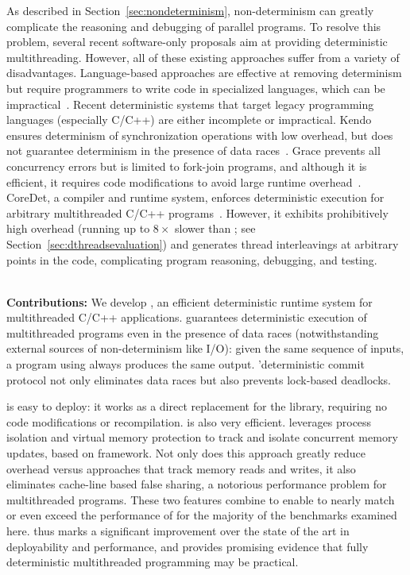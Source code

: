 
\label{chapter:dthreads}

As described in Section~\ref{sec:nondeterminism}, non-determinism can greatly complicate the reasoning and debugging of parallel programs. To resolve this problem, several recent software-only proposals aim at providing deterministic multithreading. However, all of these existing approaches suffer from a variety of disadvantages. Language-based approaches are effective at removing determinism but require programmers to write code in specialized languages, which can be impractical~\cite{Bocchino:2009:TES:1640089.1640097,Burckhardt:2010:CPR:1869459.1869515,Simpson:1999:SEE:330346.330357}. Recent deterministic systems that target legacy programming languages (especially C/C++) are either incomplete or impractical. Kendo ensures determinism of synchronization operations with low overhead, but does not guarantee determinism in the presence of data races~\cite{1508256}. Grace prevents all concurrency errors but is limited to fork-join programs, and although it is efficient, it requires code modifications to avoid large runtime overhead~\cite{grace}. CoreDet, a compiler and runtime system, enforces deterministic execution for arbitrary multithreaded C/C++ programs~\cite{Bergan:2010:CCR:1736020.1736029}. However, it exhibits prohibitively high overhead (running up to $8\times$ slower than \pthreads{}; see Section~\ref{sec:dthreadsevaluation}) and generates thread interleavings at arbitrary points in the code, complicating program reasoning, debugging, and testing.

\hspace{1em} \\
\noindent
\textbf{Contributions:}
We develop \textbf{\dthreads{}}, an efficient deterministic runtime system for multithreaded C/C++ applications. \dthreads{} guarantees deterministic execution of multithreaded programs even in the presence of data races (notwithstanding external sources of non-determinism like I/O): given the same sequence of inputs, a program using \dthreads{} always produces the same output. \dthreads{}'deterministic commit protocol not only eliminates data races but also prevents lock-based deadlocks.

\dthreads{} is easy to deploy: it works as a direct replacement for the \pthreads{} library, requiring no code modifications or
recompilation. \dthreads{} is also very efficient. \dthreads{} leverages process isolation and virtual memory protection to track and isolate concurrent memory updates, based on \sheriff{} framework. Not only does this approach greatly reduce overhead versus approaches that track memory reads and writes, it also eliminates cache-line based false sharing, a notorious performance problem for multithreaded
programs. These two features combine to enable \dthreads{} to nearly match or even exceed the performance of \pthreads{} for the majority of the benchmarks examined here. \dthreads{} thus marks a significant improvement over the state of the art in deployability and performance, and provides promising evidence that fully deterministic multithreaded programming may be practical.

